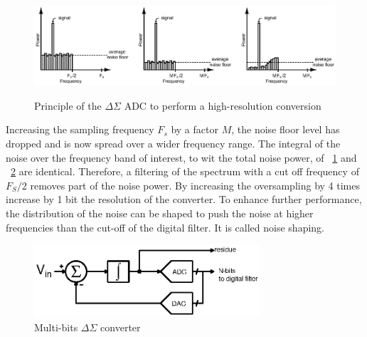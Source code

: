 \begin{figure}[htp]
    \centering
    \includegraphics[width=\textwidth]{Chapter2/Figs/Vector/sd-noise-shaping.ps}
    \begin{subfigure}[b]{0.33\textwidth}
        \label{fig:spectrum-sine-nyquist}
    \end{subfigure}
    \begin{subfigure}[b]{0.33\textwidth}
        \label{fig:spectrum-sine-oversampling}
    \end{subfigure}
    \begin{subfigure}[b]{0.33\textwidth}
    \end{subfigure}
    \caption{Principle of the $\Delta \Sigma$ ADC to perform a high-resolution conversion}
    \label{}
\end{figure}

Increasing the sampling frequency $F_s$ by a factor $M$, the noise floor level has dropped and is now spread over a wider frequency range. The integral of the noise over the frequency band of interest, to wit the total noise power, of \figurename~\ref{fig:spectrum-sine-nyquist} and \figurename~\ref{fig:spectrum-sine-oversampling} are identical. Therefore, a filtering of the spectrum with a cut off frequency of $F_S/2$ removes part of the noise power. By increasing the oversampling by 4 times increase by 1 bit the resolution of the converter. To enhance further performance, the distribution of the noise can be shaped to push the noise at higher frequencies than the cut-off of the digital filter. It is called noise shaping.

\begin{figure}[htp]
    \centering
    \includegraphics[width=0.75\textwidth]{Chapter2/Figs/Vector/sigma-delta.ps}
    \caption{Multi-bits $\Delta\Sigma$ converter}
    \label{fig:multi-bit}
\end{figure}


